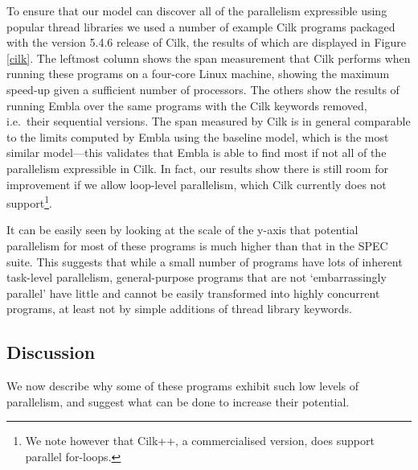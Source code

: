 To ensure that our model can discover all of the parallelism expressible using popular thread libraries we used a number of example Cilk programs packaged with the version 5.4.6 release of Cilk, the results of which are displayed in Figure \ref{cilk}.
The leftmost column shows the span measurement that Cilk performs when running these programs on a four-core Linux machine, showing the maximum speed-up given a sufficient number of processors.
The others show the results of running Embla over the same programs with the Cilk keywords removed, i.e.\ their sequential versions.
The span measured by Cilk is in general comparable to the limits computed by Embla using the baseline model, which is the most similar model---this validates that Embla is able to find most if not all of the parallelism expressible in Cilk.
In fact, our results show there is still room for improvement if we allow loop-level parallelism, which Cilk currently does not support\footnote{We note however that Cilk++, a commercialised version, does support parallel for-loops.}.

It can be easily seen by looking at the scale of the y-axis that potential parallelism for most of these programs is much higher than that in the SPEC suite.
This suggests that while a small number of programs have lots of inherent task-level parallelism, general-purpose programs that are not `embarrassingly parallel' have little and cannot be easily transformed into highly concurrent programs, at least not by simple additions of thread library keywords.

\subsection{Discussion}

We now describe why some of these programs exhibit such low levels of parallelism, and suggest what can be done to increase their potential.
